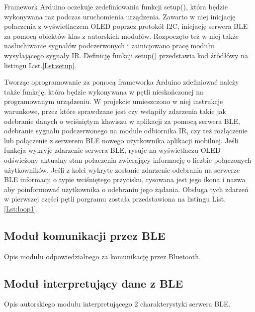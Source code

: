 \documentclass[12pt,twoside]{article}
\begin{document}


Framework Arduino oczekuje zedefiniowania funkcji setup(), która będzie wykonywana raz podczas uruchomienia urządzenia. Zawarto w niej inicjację połaczenia z wyświetlaczem OLED poprzez protokół I2C, inicjację serwera BLE za pomocą obiektów klas z autorskich modułów. Rozpoczęto też w niej także nasłuchiwanie sygnałów podczerwonych i zainicjowano pracę modułu wysyłającego sygnały IR. Definicję funkcji setup() przedstawia kod źródłówy na listingu List.\ref*{Lst:setup}.



Tworząc oprogramowanie za pomocą frameworka Arduino zdefiniować należy także funkcję, która będzie wykonywana w pętli nieskończonej na programowanym urządzeniu. W projekcie umieszczono w niej instrukcje warunkowe, przez które sprawdzane jest czy wstąpiły zdarzenia takie jak odebranie danych o wciśniętym klawiszu w aplikacji za pomocą serwera BLE, odebranie sygnału podczerwonego na module odbiornika IR, czy też rozłączenie lub połączenie z serwerem BLE nowego użytkownika aplikacji mobilnej. Jeśli funkcja wykryje zdarzenie serwera BLE, rysuje na wyświetlaczu OLED odświeżony aktualny stan połaczenia zwierający informację o liczbie połączonych użytkowników. Jeśli z kolei wykryte zostanie zdarzenie odebrania na serwerze BLE informacji o typie wciśniętego przycisku, rysowana jest jego ikona i nazwa aby poinformować użytkownika o odebraniu jego żądania. Obsługa tych zdarzeń w pierwszej części pętli porgramu została przedstawiona na listingu List.\ref*{Lst:loop1}.



\subsection{Moduł komunikacji przez BLE}
Opis modułu odpowiedzialnego za komunikację przez Bluetooth.
\subsection{Moduł interpretujący dane z BLE}
Opis autorskiego modułu interpretującego 2 charakterystyki serwera BLE.
\end{document}

